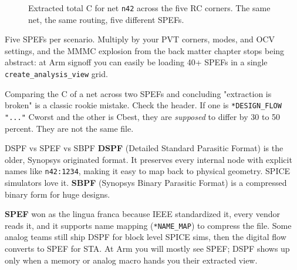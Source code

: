 \begin{figure}[h]
\centering
{}
\caption{Extracted total C for net \texttt{n42} across the five RC corners. The same net, the same routing, five different SPEFs.}
\label{fig:corners}
\end{figure}

Five SPEFs per scenario. Multiply by your PVT corners, modes, and OCV settings, and the MMMC explosion from the back matter chapter stops being abstract: at Arm signoff you can easily be loading 40+ SPEFs in a single \texttt{create\_analysis\_view} grid.

\begin{pitfall}
Comparing the C of a net across two SPEFs and concluding "extraction is broken" is a classic rookie mistake. Check the header. If one is \texttt{*DESIGN\_FLOW "..."} Cworst and the other is Cbest, they are \emph{supposed} to differ by 30 to 50 percent. They are not the same file.
\end{pitfall}

\begin{sidebar}{DSPF vs SPEF vs SBPF}
\textbf{DSPF} (Detailed Standard Parasitic Format) is the older, Synopsys originated format. It preserves every internal node with explicit names like \texttt{n42:1234}, making it easy to map back to physical geometry. SPICE simulators love it. \textbf{SBPF} (Synopsys Binary Parasitic Format) is a compressed binary form for huge designs.

\textbf{SPEF} won as the lingua franca because IEEE standardized it, every vendor reads it, and it supports name mapping (\texttt{*NAME\_MAP}) to compress the file. Some analog teams still ship DSPF for block level SPICE sims, then the digital flow converts to SPEF for STA. At Arm you will mostly see SPEF; DSPF shows up only when a memory or analog macro hands you their extracted view.
\end{sidebar}

